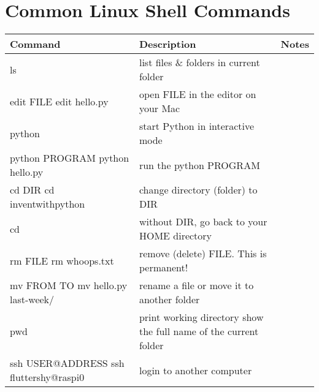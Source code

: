 \documentclass{article}
\begin{document}

\section{Common Linux Shell Commands}

\begin{tabularx}{\textwidth}{@{} Y Y Y @{}}
  Command & Description & Notes \\
  \midrule
   ls & list files \& folders in current folder & \\
   edit FILE \newline edit hello.py & open FILE in the editor on your Mac & \\
   python & start Python in interactive mode & \\
   python PROGRAM \newline python hello.py & run the python PROGRAM & \\
   cd DIR \newline cd inventwithpython & change directory (folder) to DIR & \\
   cd & without DIR, go back to your  HOME directory & \\
   rm FILE \newline rm whoops.txt & remove (delete) FILE.  This is permanent! & \\
   mv FROM TO \newline mv hello.py last-week/  & rename a file or move it to another folder & \\
   pwd & print working directory \newline show the full name of the current folder & \\
   ssh USER@ADDRESS \newline ssh fluttershy@raspi0 & login to another computer & \\
\end{tabularx}
 
\end{document}
